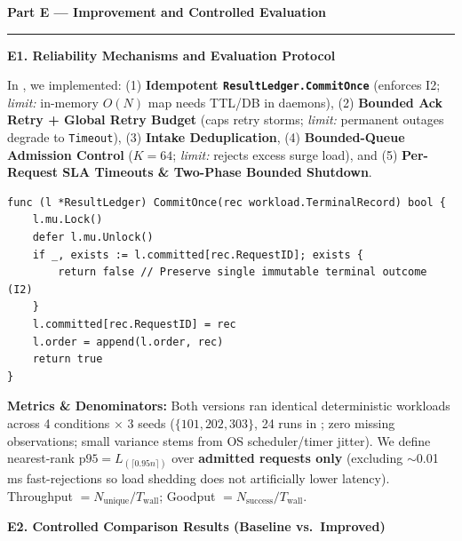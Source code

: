 \documentclass[11pt]{article}
\newcommand{\partheader}[1]{%
    \vspace{1.0em}%
    {\noindent\fontsize{13.5}{16}\selectfont\textbf{\color{accentblue}#1}\par}%
    \vspace{0.2em}\hrule\vspace{0.7em}%
}
\newcommand{\subhead}[1]{\vspace{0.6em}\noindent\textbf{\large #1}\par\vspace{0.25em}}
\begin{document}
\clearpage
\partheader{Part E --- Improvement and Controlled Evaluation}

\subhead{E1. Reliability Mechanisms and Evaluation Protocol}
In , we implemented: (1) \textbf{Idempotent \texttt{ResultLedger.CommitOnce}} (enforces I2; \textit{limit:} in-memory $O(N)$ map needs TTL/DB in daemons), (2) \textbf{Bounded Ack Retry + Global Retry Budget} (caps retry storms; \textit{limit:} permanent outages degrade to \texttt{Timeout}), (3) \textbf{Intake Deduplication}, (4) \textbf{Bounded-Queue Admission Control} ($K=64$; \textit{limit:} rejects excess surge load), and (5) \textbf{Per-Request SLA Timeouts \& Two-Phase Bounded Shutdown}.

\begin{lstlisting}
func (l *ResultLedger) CommitOnce(rec workload.TerminalRecord) bool {
    l.mu.Lock()
    defer l.mu.Unlock()
    if _, exists := l.committed[rec.RequestID]; exists {
        return false // Preserve single immutable terminal outcome (I2)
    }
    l.committed[rec.RequestID] = rec
    l.order = append(l.order, rec)
    return true
}
\end{lstlisting}

\textbf{Metrics \& Denominators:} Both versions ran identical deterministic workloads across 4 conditions $\times$ 3 seeds ($\{101, 202, 303\}$, 24 runs in ; zero missing observations; small variance stems from OS scheduler/timer jitter). We define nearest-rank $\text{p95} = L_{(\lceil 0.95n \rceil)}$ over \textbf{admitted requests only} (excluding $\sim$0.01\,ms fast-rejections so load shedding does not artificially lower latency). Throughput $= N_{\text{unique}}/T_{\text{wall}}$; Goodput $= N_{\text{success}}/T_{\text{wall}}$.

\subhead{E2. Controlled Comparison Results (Baseline vs.\ Improved)}
\end{document}
